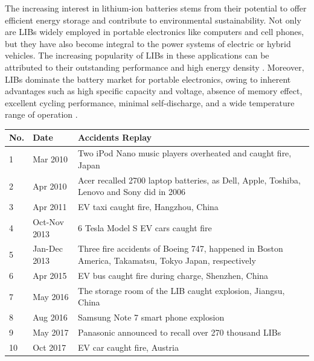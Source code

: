 The increasing interest in lithium-ion batteries stems from their potential to offer efficient energy storage and contribute to environmental sustainability. Not only are LIBs widely employed in portable electronics like computers and cell phones, but they have also become integral to the power systems of electric or hybrid vehicles. The increasing popularity of LIBs in these applications can be attributed to their outstanding performance and high energy density \cite{kang2020binder}. Moreover, LIBs dominate the battery market for portable electronics, owing to inherent advantages such as high specific capacity and voltage, absence of memory effect, excellent cycling performance, minimal self-discharge, and a wide temperature range of operation \cite{zubi2018lithium}.

\begin{table}[ht]
    \centering
        \begin{footnotesize}
            \begin{tabular}{|p{7mm} p{22mm} p{113mm}|}
                \hline
                \rowcolor{bluepoli!40}
                \textbf{No.} & \textbf{Date} & \textbf{Accidents Replay}\T\B \\
                \hline \hline
                1 & Mar 2010 & Two iPod Nano music players overheated and caught fire, Japan\T\B\\
                2 & Apr 2010 & Acer recalled 2700 laptop batteries, as Dell, Apple, Toshiba, Lenovo and Sony did in 2006\T\B\\
                3 & Apr 2011 & EV taxi caught fire, Hangzhou, China\T\B\\
                4 & Oct-Nov 2013 & 6 Tesla Model S EV cars caught fire\T\B\\
                5 & Jan-Dec 2013 & Three fire accidents of Boeing 747, happened in Boston America, Takamatsu, Tokyo Japan, respectively\T\B\\
                6 & Apr 2015 & EV bus caught fire during charge, Shenzhen, China\T\B\\
                7 & May 2016 & The storage room of the LIB caught explosion, Jiangsu, China\T\B\\
                8 & Aug 2016 & Samsung Note 7 smart phone explosion\T\B\\
                9 & May 2017 & Panasonic announced to recall over 270 thousand LIBs\T\B\\
                10 & Oct 2017 & EV car caught fire, Austria\T\B\\

\end{tabular}
\end{footnotesize}
\end{table}
